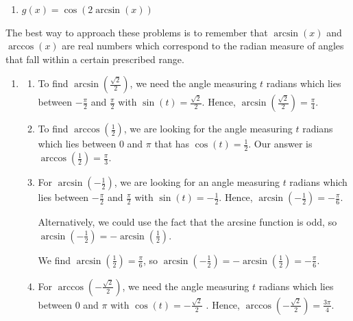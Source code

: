 \documentclass{ximera}
\begin{document}
\begin{example}
\begin{enumerate}
\begin{enumerate}
\item  \label{cosarcsin} $g(x) = \cos\left(2 \arcsin(x)\right)$

\end{enumerate}

\end{enumerate}

\begin{explanation}

The best way to approach these problems is to remember that $\arcsin(x)$ and $\arccos(x)$ are real numbers which correspond to the radian measure of angles that fall within a certain prescribed range.

\begin{enumerate}

\item 

\begin{enumerate}

\item  To find $\arcsin\left(\frac{\sqrt{2}}{2}\right)$, we need the angle measuring $t$ radians which lies between $-\frac{\pi}{2}$ and $\frac{\pi}{2}$ with $\sin(t) = \frac{\sqrt{2}}{2}$. Hence, $\arcsin\left(\frac{\sqrt{2}}{2}\right) = \frac{\pi}{4}$.

\item  To find $\arccos\left(\frac{1}{2}\right)$, we are looking for the angle measuring $t$ radians which lies between $0$ and $\pi$ that has  $\cos(t) = \frac{1}{2}$.   Our answer is $\arccos\left(\frac{1}{2}\right)= \frac{\pi}{3}$.

\item  For  $\arcsin\left(-\frac{1}{2}\right)$,  we are looking for an angle measuring $t$ radians which lies between $-\frac{\pi}{2}$ and $\frac{\pi}{2}$ with $\sin(t) = -\frac{1}{2}$. Hence,  $\arcsin\left(-\frac{1}{2}\right) = -\frac{\pi}{6}$.

 

Alternatively, we could use the fact that the arcsine function is odd, so $\arcsin\left(-\frac{1}{2}\right) = - \arcsin\left(\frac{1}{2}\right)$.

 

We find  $\arcsin\left(\frac{1}{2}\right) = \frac{\pi}{6}$, so $\arcsin\left(-\frac{1}{2}\right) = - \arcsin\left(\frac{1}{2}\right) = -\frac{\pi}{6}$.


\item  For $\arccos\left(-\frac{\sqrt{2}}{2}\right)$, we need the angle measuring $t$ radians which lies between $0$ and $\pi$ with $\cos(t) = -\frac{\sqrt{2}}{2}$  .  Hence, $\arccos\left(-\frac{\sqrt{2}}{2}\right) = \frac{3\pi}{4}$.



\end{enumerate}
\end{enumerate}
\end{explanation}
\end{example}
\end{document}

